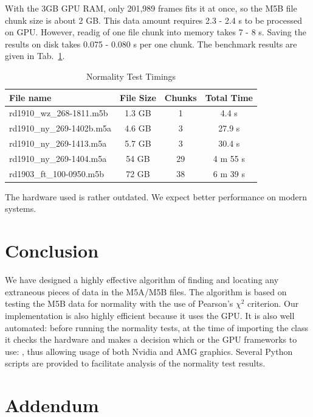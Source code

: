 \documentclass[letterpaper,twoside,12pt]{article}
\begin{document}
With the 3GB GPU RAM, only 201,989 frames fits it at once, so the M5B file chunk size is about 2 GB. This data amount requires 2.3 - 2.4 s to be processed on GPU. However, readig of one file chunk into memory takes 7 - 8 s. Saving the results on disk takes 0.075 - 0.080 s per one chunk. The benchmark results are given in Tab.~\ref{timings}.

\begin{table}[ht!]
  \begin{center}
    \caption{Normality Test Timings}
    \label{timings}
    \begin{tabular}{l|c|c|c}
      \textbf{File name} & \textbf{File Size} & \textbf{Chunks} & \textbf{Total Time} \\
      \hline
      rd1910\_wz\_268-1811.m5b & 1.3 GB & 1 &  4.4 s \\
      rd1910\_ny\_269-1402b.m5a & 4.6 GB & 3 & 27.9 s \\
      rd1910\_ny\_269-1413.m5a & 5.7 GB & 3 & 30.4 s \\
      rd1910\_ny\_269-1404.m5a & 54 GB & 29 & 4 m 55 s \\
      rd1903\_ft\_100-0950.m5b & 72 GB & 38 & 6 m 39 s\\
    \end{tabular}
  \end{center}
\end{table}

The hardware used is rather outdated. We expect better performance on modern systems. 
 

\section{Conclusion}

We have designed a highly effective algorithm of finding and locating any extraneous pieces of data in the M5A/M5B files. The algorithm is based on testing the M5B data for normality with the use of Pearson's $\chi^2$ criterion. Our implementation is also highly efficient because it uses the GPU. It is also well automated: before running the normality tests, at the time of importing the class \verb@Normtest@ it checks the hardware and makes a decision which or the GPU frameworks to use: \verb@CUDA@ \verb@OpenCL@, thus allowing usage of both Nvidia and AMG graphics. Several Python scripts are provided to facilitate analysis of the normality test results.


\pagebreak

\section*{Addendum}
\end{document}
